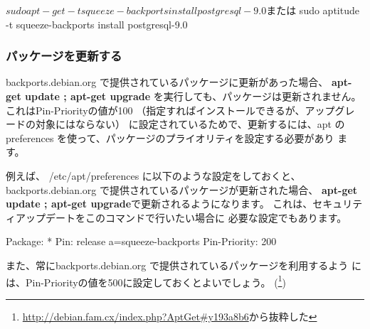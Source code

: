 \documentclass[mingoth,a4paper]{jsarticle}
\begin{document}
\begin{commandline}
$ sudo apt-get -t squeeze-backports install postgresql-9.0
または
$ sudo aptitude -t squeeze-backports install postgresql-9.0
\end{commandline}

\subsubsection{パッケージを更新する}

backports.debian.org で提供されているパッケージに更新があった場合、
{\bf{apt-get update ; apt-get upgrade}}
を実行しても、パッケージは更新されません。
これはPin-Priorityの値が100
（指定すればインストールできるが、アップグレードの対象にはならない）
に設定されているためで、更新するには、apt
の preferences を使って、パッケージのプライオリティを設定する必要があり
ます。

例えば、 /etc/apt/preferences に以下のような設定をしておくと、
backports.debian.org で提供されているパッケージが更新された場合、
{\bf{apt-get update ; apt-get upgrade}}で更新されるようになります。
これは、セキュリティアップデートをこのコマンドで行いたい場合に
必要な設定でもあります。
\begin{commandline}
Package: *
Pin: release a=squeeze-backports
Pin-Priority: 200
\end{commandline}

また、常にbackports.debian.org で提供されているパッケージを利用するよう
には、Pin-Priorityの値を500に設定しておくとよいでしょう。
(\footnote{\url{http://debian.fam.cx/index.php?AptGet\#y193a8b6}から抜粋した})
\end{document}
